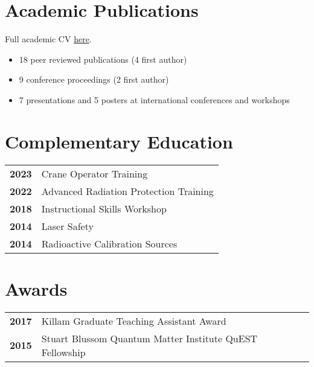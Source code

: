 \documentclass[lighthipster]{simplehipstercv}
\begin{document}
\begin{paracol}{2}
\vspace{0.5em}

\begin{minipage}[t]{0.37\textwidth}

\section*{Academic Publications}
Full academic CV \href{https://github.com/dfujim/cv/blob/master/fujimoto_cv.pdf}{here}.

\begin{itemize}[noitemsep]
    \item 18 peer reviewed publications (4 first author)
    \item 9 conference proceedings (2 first author)
    \item 7 presentations and 5 posters at international conferences and workshops
\end{itemize}

\bigskip
\vspace{-2em}

\section*{Complementary Education}
\begin{tabular}{>{\footnotesize\bfseries}r >{\footnotesize}p{}}
    2023 & Crane Operator Training \\
    2022 & Advanced Radiation Protection Training\\
    2018 & Instructional Skills Workshop\\
    2014 & Laser Safety\\
    2014 & Radioactive Calibration Sources
\end{tabular}

\bigskip

\end{minipage}\hfill
\begin{minipage}[t]{0.31\textwidth}

    \section*{Awards}
    \begin{tabular}{>{\footnotesize\bfseries}r >{\footnotesize}p{}}
        2017 & Killam Graduate Teaching Assistant Award\\
        2015 & Stuart Blussom Quantum Matter Institute QuEST Fellowship
    \end{tabular}


\end{minipage}
\end{paracol}
\end{document}
